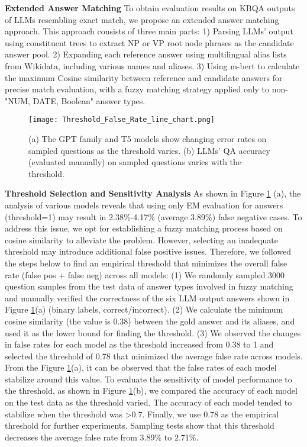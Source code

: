 \documentclass[runningheads]{llncs}
\begin{document}
\textbf{Extended Answer Matching} To obtain evaluation results on KBQA outputs of LLMs resembling exact match, we propose an extended answer matching approach. This approach consists of three main parts:
1) Parsing LLMs' output using constituent trees \cite{he-choi-2021-stem} to extract NP or VP root node phrases as the candidate answer pool.
2) Expanding each reference answer using multilingual alias lists from Wikidata, including various names and aliases.
3) Using m-bert \cite{kenton2019bert} to calculate the maximum Cosine similarity between reference and candidate answers for precise match evaluation, with a fuzzy matching strategy applied only to non-"NUM, DATE, Boolean" answer types.




\begin{figure}[t]
\texttt{[image: Threshold\_False\_Rate\_line\_chart.png]}
\caption{(a) The GPT family and T5 models show changing error rates on sampled questions as the threshold varies. (b) LLMs' QA accuracy (evaluated manually) on sampled questions varies with the threshold.} \label{fig10}
\end{figure}

\textbf{Threshold Selection and Sensitivity Analysis} 
As shown in Figure \ref{fig10} (a), the analysis of various models reveals that using only EM evaluation for answers (threshold=1) may result in 2.38\%-4.17\% (average 3.89\%) false negative cases. To address this issue, we opt for establishing a fuzzy matching process based on cosine similarity to alleviate the problem. However, selecting an inadequate threshold may introduce additional false positive issues. Therefore, we followed the steps below to find an empirical threshold that minimizes the overall false rate (false pos + false neg) across all models:
(1) We randomly sampled 3000 question samples from the test data of answer types involved in fuzzy matching and manually verified the correctness of the six LLM output answers shown in Figure \ref{fig10}(a) (binary labels, correct/incorrect).
(2) We calculate the minimum cosine similarity (the value is 0.38) between the gold answer and its aliases, and used it as the lower bound for finding the threshold.
(3) We observed the changes in false rates for each model as the threshold increased from 0.38 to 1 and selected the threshold of 0.78 that minimized the average false rate across models. From the Figure \ref{fig10}(a), it can be observed that the false rates of each model stabilize around this value. 
To evaluate the sensitivity of model performance to the threshold, as shown in Figure \ref{fig10}(b), we compared the accuracy of each model on the test data as the threshold varied. The accuracy of each model tended to stabilize when the threshold was >0.7.
Finally, we use 0.78 as the empirical threshold for further experiments. Sampling tests show that this threshold decreases the average false rate from 3.89\% to 2.71\%.
\end{document}
